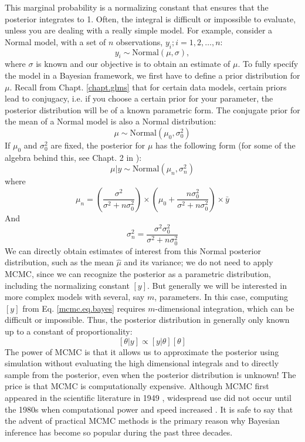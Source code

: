This marginal probability is a normalizing constant that ensures that
the posterior integrates to 1. Often, the
integral is difficult or impossible to evaluate, unless you are
dealing with a really simple model.  For example, consider
a Normal model, with a set of $n$ observations, $y_{i};
i=1,2,\ldots,n$:
\[
 y_{i} \sim \mbox{Normal}(\mu, \sigma),
\]
where $\sigma$ is known and our objective is to obtain an estimate of
$\mu$. To fully specify the model in a Bayesian
framework, we first have to define a prior distribution for $\mu$. Recall
from Chapt. \ref{chapt.glms}
that for certain data models, certain priors lead to
conjugacy, i.e. if you choose a certain prior for your parameter,
the posterior distribution will be of a known parametric form. The
conjugate prior for the mean of a Normal model is also a Normal
distribution:
\[
\mu \sim \mbox{Normal}(\mu_0, \sigma_{0}^{2})
\]
If $\mu_{0}$ and $\sigma_{0}^{2}$ are fixed, the posterior for $\mu$
has the following form (for some of the algebra behind this, see Chapt. 2 in \citet{gelman_etal:2004}):
\begin{equation}
\mu|y \sim \mbox{Normal}(\mu_{n}, \sigma_{n}^{2})
\label{mcmc.eq.mu-posterior}
\end{equation}
where
\[
\mu_{n} = \left( \frac{ \sigma^{2}}  {\sigma^{2}   +n \sigma_{0}^{2}} \right) \times  \left(\mu_0 +      \frac{n  \sigma_{0}^{2}}  {\sigma^{2}   +n \sigma_{0}^{2}} \right) \times\bar{y}
\]
And
\[
 \sigma_{n}^{2} = \frac{\sigma^{2}  \sigma_{0}^{2}} {\sigma^{2} + n \sigma_{0}^{2}}
\]
We can directly obtain estimates of interest from this Normal
posterior distribution, such as the mean $\hat{\mu}$ and its variance; we
do not need to apply MCMC, since we can recognize the posterior as a
parametric distribution, including the normalizing constant $[y]$.
But generally we will be interested in more complex models with
several, say $m$, parameters. In this case, computing $[y]$ from
Eq. \ref{mcmc.eq.bayes} requires $m$-dimensional integration, which
can be difficult or impossible. Thus, the posterior distribution in
generally only known up to a constant of proportionality:
\[
[\theta|y] \propto [y|\theta]  [\theta]
\]
The power of MCMC is that it allows us to approximate the posterior
using simulation without evaluating the high dimensional integrals and
to directly sample from the posterior, even when the posterior
distribution is unknown! The price is that MCMC is computationally
expensive. Although MCMC first appeared in the scientific literature
in 1949 \citep{metropolis_etal:1949}, widespread use did not occur
until the 1980s when computational power and speed increased
\citep{gelfand_smith:1990}. It is safe to say that the advent of
practical MCMC methods is the primary reason why Bayesian inference
has become so popular during the past three decades.

